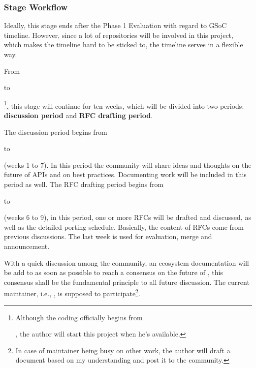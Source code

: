 \subsubsection*{Stage Workflow}

Ideally, this stage ends after the \textsf{Phase 1 Evaluation} with regard to GSoC timeline. However, since a lot of repositories will be involved in this project, which makes the timeline hard to be sticked to, the timeline serves in a flexible way.\par

From \date{April 22} to \date{June 24}\footnote{Although the coding officially begins from \date{May 27}, the author will start this project when he's available.}, this stage will continue for ten weeks, which will be divided into two periods: \textbf{discussion period} and \textbf{RFC drafting period}.\par

The discussion period begins from \date{April 22} to \date{June 9} (weeks 1 to 7). In this period the community will share ideas and thoughts on the future of APIs and on best practices. Documenting work will be included in this period as well. The RFC drafting period begins from \date{May 27} to \date{June 23} (weeks 6 to 9), in this period, one or more RFCs will be drafted and discussed, as well as the detailed porting schedule. Basically, the content of RFCs come from previous discussions. The last week is used for evaluation, merge and announcement.\par

With a quick discussion among the community, an ecosystem documentation will be add to \repoimagesgithubio{} as soon as possible to reach a consensus on the future of \images{}, this consensus shall be the fundamental principle to all future discussion. The current \images{} maintainer, i.e., \timholy, is supposed to participate\footnote{In case of maintainer being busy on other work, the author will draft a document based on my understanding and post it to the community.}.\par

